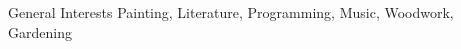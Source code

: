 \documentclass{resume} %
\begin{document}
\begin{rSection}{General Interests}
Painting, Literature, Programming, Music, Woodwork, Gardening
\end{rSection}





\end{document}
